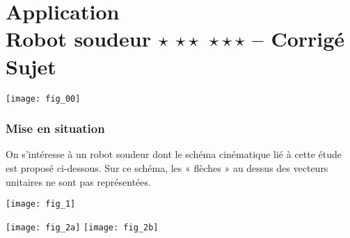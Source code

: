 \chapter*{Application  \\ 
Robot soudeur  \ifnormal $\star$ \else \fi \ifdifficile $\star\star$ \else \fi \iftdifficile $\star\star\star$ \else \fi
 -- \ifprof Corrigé \else Sujet \fi}

\iflivret {} \else
\ifprof  {} \else \fi
\fi

\setcounter{question}{0}
\marginnote[1cm]{
}

\begin{marginfigure}
\texttt{[image: fig\_00]}
\end{marginfigure}


\subsection*{Mise en situation}

On s’intéresse à un robot soudeur dont le schéma cinématique lié à cette étude est proposé ci-dessous.
Sur ce schéma, les « flèches » au dessus des vecteurs unitaires ne sont pas représentées.


\begin{center}
\texttt{[image: fig\_1]}
\end{center}

\begin{marginfigure}
\centering
\texttt{[image: fig\_2a]}
\texttt{[image: fig\_2b]}
\end{marginfigure}

